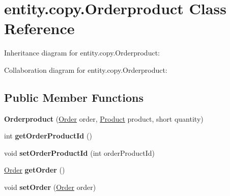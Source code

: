 \hypertarget{classentity_1_1copy_1_1_orderproduct}{}\section{entity.\+copy.\+Orderproduct Class Reference}
\label{classentity_1_1copy_1_1_orderproduct}


Inheritance diagram for entity.\+copy.\+Orderproduct\+:


Collaboration diagram for entity.\+copy.\+Orderproduct\+:
\subsection*{Public Member Functions}
\begin{DoxyCompactItemize}
\item 
\mbox{\label{classentity_1_1copy_1_1_orderproduct_ab7f6fed29d1697ec8d704002338fd840}} 
{\bfseries Orderproduct} (\mbox{\hyperlink{classentity_1_1copy_1_1_order}{Order}} order, \mbox{\hyperlink{classentity_1_1copy_1_1_product}{Product}} product, short quantity)
\item 
\mbox{\label{classentity_1_1copy_1_1_orderproduct_a659a540d9dd34e67dce92c2c8ad1f9c6}} 
int {\bfseries get\+Order\+Product\+Id} ()
\item 
\mbox{\label{classentity_1_1copy_1_1_orderproduct_ad689ca8d2521567a1bf983067d225fd6}} 
void {\bfseries set\+Order\+Product\+Id} (int order\+Product\+Id)
\item 
\mbox{\label{classentity_1_1copy_1_1_orderproduct_a6af4a2b7aca0d72695ab12ef2d542004}} 
\mbox{\hyperlink{classentity_1_1copy_1_1_order}{Order}} {\bfseries get\+Order} ()
\item 
\mbox{\label{classentity_1_1copy_1_1_orderproduct_aea27a0c453a89d2367f411dc7f9c95ba}} 
void {\bfseries set\+Order} (\mbox{\hyperlink{classentity_1_1copy_1_1_order}{Order}} order)
\item 
\mbox{\label{classentity_1_1copy_1_1_orderproduct_add40f07b41fc7923ae8fe1b36e257deb}} 

\end{DoxyCompactItemize}
